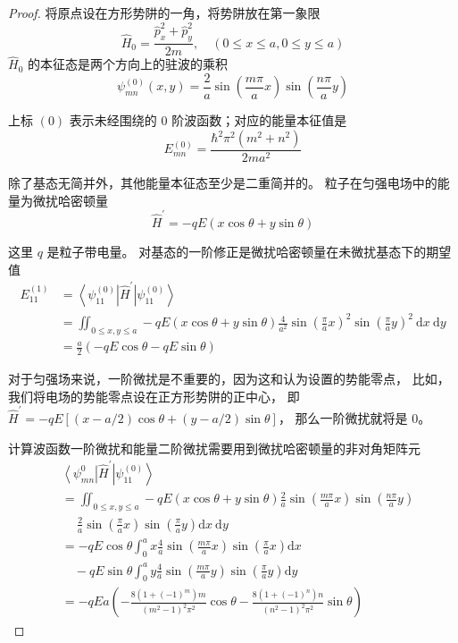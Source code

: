 \begin{proof}
    将原点设在方形势阱的一角，将势阱放在第一象限
$$\hat{H}_{0}=\frac{\hat{p}_{x}^{2}+\hat{p}_{y}^{2}}{2m}, 
\quad(0 \leq x \leq a, 0 \leq y \leq a)$$
$\hat{H}_{0}$ 的本征态是两个方向上的驻波的乘积
$$\psi_{m n}^{(0)}(x, y)=\frac{2}{a} \sin \left(\frac{m \pi}{a} x\right) \sin \left(\frac{n \pi}{a} y\right)$$

上标 $(0)$ 表示未经围绕的 $0$ 阶波函数；对应的能量本征值是
$$E_{m n}^{(0)}=\frac{\hbar^{2} \pi^{2}(m^{2}+n^{2})}{2ma^{2}}$$

除了基态无简并外，其他能量本征态至少是二重简并的。
粒子在匀强电场中的能量为微扰哈密顿量
$$\hat{H}^{\prime}=-q E(x \cos \theta+y \sin \theta)$$

这里 $q$ 是粒子带电量。
对基态的一阶修正是微扰哈密顿量在未微扰基态下的期望值
$$\begin{aligned}
E_{11}^{(1)} & =\left\langle\psi_{11}^{(0)}\right| \hat{H}^{\prime}\left|\psi_{11}^{(0)}\right\rangle \\
& =\iint_{0 \leq x, y \leq a}-q E(x \cos \theta+y \sin \theta) \frac{4}{a^{2}} \sin \left(\frac{\pi}{a} x\right)^{2} \sin \left(\frac{\pi}{a} y\right)^{2} \mathrm{~d} x \mathrm{~d} y \\
& =\frac{a}{2}(-q E \cos \theta-q E \sin \theta)
\end{aligned}$$

对于匀强场来说，一阶微扰是不重要的，因为这和认为设置的势能零点，
比如，我们将电场的势能零点设在正方形势阱的正中心，
即 $\hat{H}^{\prime}=-q E[(x-a / 2) \cos \theta+(y-a / 2) \sin \theta]$，
那么一阶微扰就将是 $0$。

计算波函数一阶微扰和能量二阶微扰需要用到微扰哈密顿量的非对角矩阵元
$$\begin{aligned}
& \left\langle\psi_{m n}^{0}\right| \hat{H}^{\prime}\left|\psi_{11}^{(0)}\right\rangle \\
&= \iint_{0 \leq x, y \leq a}-q E(x \cos \theta+y \sin \theta) \frac{2}{a} \sin \left(\frac{m \pi}{a} x\right) \sin \left(\frac{n \pi}{a} y\right) \\
& \quad\ \frac{2}{a} \sin \left(\frac{\pi}{a} x\right) \sin \left(\frac{\pi}{a} y\right) \mathrm{d} x \mathrm{~d} y \\
&= -q E \cos \theta \int_{0}^{a} x \frac{4}{a} \sin \left(\frac{m \pi}{a} x\right) \sin \left(\frac{\pi}{a} x\right) \mathrm{d} x \\
& \quad -q E \sin \theta \int_{0}^{a} y \frac{4}{a} \sin \left(\frac{m \pi}{a} y\right) \sin \left(\frac{\pi}{a} y\right) \mathrm{d} y \\
&= -q E a\left(-\frac{8\left(1+(-1)^{m}\right) m}{(m^{2}-1)^{2} \pi^{2}} \cos \theta-\frac{8\left(1+(-1)^{n}\right) n}{(n^{2}-1)^{2} \pi^{2}} \sin \theta\right)
\end{aligned}$$


\end{proof}
